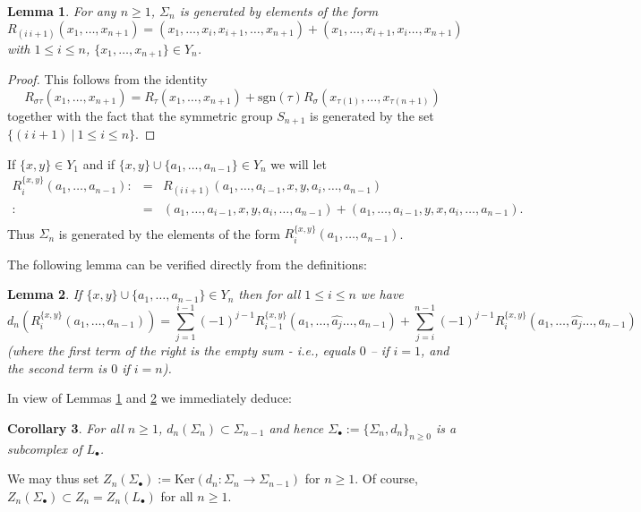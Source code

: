 \documentclass[12pt]{amsart}
\newtheorem{lem}{Lemma}[section]
\newtheorem{cor}[lem]{Corollary}
\theoremstyle{definition}
\newcommand{\<}{\langle}
\renewcommand{\>}{\rangle}
\renewcommand{\ker}[1]{\mathrm{Ker}(#1)}
\newcommand{\sgn}[1]{\mathrm{sgn}(#1)}
\renewcommand{\sgn}[1]{\mathrm{sgn}(#1)}
\begin{document}
\begin{lem}\label{lem:gen}  For any $n\geq 1$, $\Sigma_n$ is generated by elements of the form
 \[
R_{(i\  i+1)}(x_1,\ldots,x_{n+1})=(x_1,\ldots, x_i,x_{i+1},\ldots ,x_{n+1})+(x_1,\ldots, x_{i+1},x_i\ldots ,x_{n+1})
\]
with $1\leq i\leq n$, $\{ x_1,\ldots,x_{n+1}\}\in Y_n$.
\end{lem}


\begin{proof}  This follows from the identity
\[
R_{\sigma\tau}(x_1,\ldots,x_{n+1})=R_{\tau}(x_1,\ldots,x_{n+1})+\sgn{\tau}R_{\sigma}(x_{\tau(1)},\ldots,x_{\tau(n+1)})
\]
together with the fact that the symmetric group  $S_{n+1}$ is generated by the set\\
 $\{ (i\ i+1)\ |\ 1\leq i\leq n\}$.
\end{proof}

If  $\{ x,y\}\in Y_1$ and if $\{ x,y\}\cup \{ a_1,\ldots,a_{n-1}\}\in Y_n$  we will let 
 \begin{eqnarray*}
R^{\{ x,y\}}_i(a_1,\ldots,a_{n-1}):&=& R_{(i\ i+1)}(a_1,\ldots,a_{i-1},x,y,a_i,\ldots,a_{n-1})\\
:&=& (a_1,\ldots,a_{i-1},x,y,a_i,\ldots,a_{n-1})+(a_1,\ldots,a_{i-1},y,x,a_i,\ldots,a_{n-1}).\\
\end{eqnarray*}
Thus $\Sigma_n$ is generated by the elements of the form $R^{\{ x,y\}}_i(a_1,\ldots,a_{n-1})$.

The following lemma can be verified directly from the definitions:
\begin{lem}\label{lem:d} If $\{x,y\}\cup\{ a_1,\ldots,a_{n-1}\}\in Y_n$ then for all $1\leq i\leq n$ we have
\[
d_n(R^{\{ x,y\}}_i(a_1,\ldots,a_{n-1}))=\sum_{j=1}^{i-1}(-1)^{j-1}R^{\{x,y\}}_{i-1}(a_1,\ldots,\hat{a_j}\ldots,a_{n-1})+\sum_{j=i}^{n-1}(-1)^{j-1}R^{\{x,y\}}_{i}(a_1,\ldots,\hat{a_j}\ldots,a_{n-1})
\]
(where the first term of the right is the empty sum  - i.e., equals $0$ --  if $i=1$, and the second term is $0$ if $i=n$).
\end{lem}

In view of Lemmas \ref{lem:gen} and \ref{lem:d} we immediately deduce:

\begin{cor}\label{cor:subcplx}  For all $n\geq 1$, $d_n(\Sigma_n)\subset \Sigma_{n-1}$ and hence $\Sigma_\bullet:=\{ \Sigma_n,d_n\}_{n\geq 0}$ is a subcomplex of $L_\bullet$.
\end{cor}

We may thus set $Z_n(\Sigma_\bullet):= \ker{d_n:\Sigma_n\to \Sigma_{n-1}}$ for $n\geq 1$. Of course, $Z_n(\Sigma_\bullet)\subset Z_n=Z_n(L_\bullet)$ for all $n\geq 1$.
\end{document}
